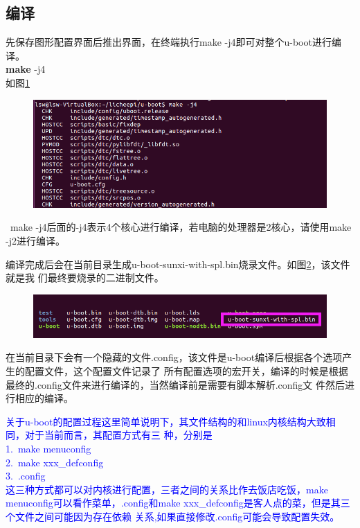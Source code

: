\subsection{编译}
先保存图形配置界面后推出界面，在终端执行make -j4即可对整个u-boot进行编译。\\
\textbf{make} -j4 \\
如图\ref{fig:ubootmake}
\begin{figure}[htbp]
	\centering
	\includegraphics[width=1\linewidth]{chapter2/img/ubootmake}
	\caption{}
	\label{fig:ubootmake}
\end{figure}
\begin{tcolorbox}[colback=red!5!white,colframe=red!75!black]
	\faBellO \  
	make -j4后面的-j4表示4个核心进行编译，若电脑的处理器是2核心，请使用make -j2进行编译。
\end{tcolorbox}
编译完成后会在当前目录生成u-boot-sunxi-with-spl.bin烧录文件。如图\ref{fig:ubootsunxispl}，该文件就是我
们最终要烧录的二进制文件。
\begin{figure}[htbp]
	\centering
	\includegraphics[width=1\linewidth]{chapter2/img/ubootsunxispl}
	\caption{}
	\label{fig:ubootsunxispl}
\end{figure}
在当前目录下会有一个隐藏的文件.config，该文件是u-boot编译后根据各个选项产生的配置文件，这个配置文件记录了
所有配置选项的宏开关，编译的时候是根据最终的.config文件来进行编译的，当然编译前是需要有脚本解析.config文
件然后进行相应的编译。
\begin{note}
	\textcolor{blue}{
	关于u-boot的配置过程这里简单说明下，其文件结构的和linux内核结构大致相同，对于当前而言，其配置方式有三
	种，分别是\\
	1.\ make menuconfig \\
	2.\ make xxx\_defconfig \\
	3.\ .config  \\
	这三种方式都可以对内核进行配置，三者之间的关系比作去饭店吃饭，make 
	menuconfig可以看作菜单，.config和make xxx\_defconfig是客人点的菜，但是其三个文件之间可能因为存在依赖
	关系,如果直接修改.config可能会导致配置失效。
	}
\end{note}
